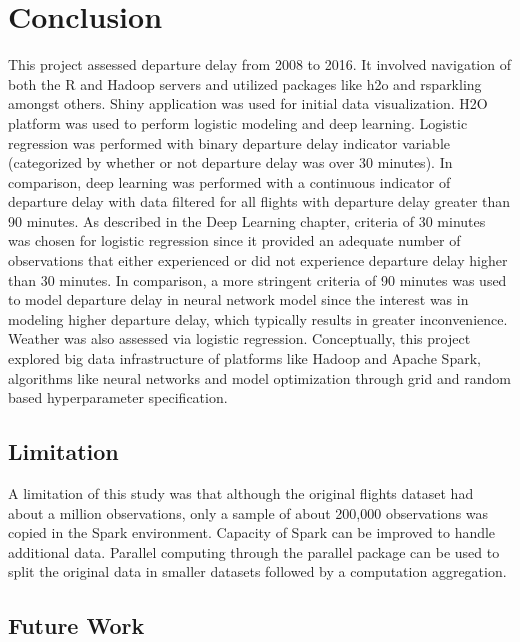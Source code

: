 \documentclass[12pt,twoside]{amherstthesis}
\begin{document}
  \chapter*{Conclusion}\label{conclusion-2}
  
  This project assessed departure delay from 2008 to 2016. It involved
  navigation of both the R and Hadoop servers and utilized packages like
  h2o and rsparkling amongst others. Shiny application was used for
  initial data visualization. H2O platform was used to perform logistic
  modeling and deep learning. Logistic regression was performed with
  binary departure delay indicator variable (categorized by whether or not
  departure delay was over 30 minutes). In comparison, deep learning was
  performed with a continuous indicator of departure delay with data
  filtered for all flights with departure delay greater than 90 minutes.
  As described in the Deep Learning chapter, criteria of 30 minutes was
  chosen for logistic regression since it provided an adequate number of
  observations that either experienced or did not experience departure
  delay higher than 30 minutes. In comparison, a more stringent criteria
  of 90 minutes was used to model departure delay in neural network model
  since the interest was in modeling higher departure delay, which
  typically results in greater inconvenience. Weather was also assessed
  via logistic regression. Conceptually, this project explored big data
  infrastructure of platforms like Hadoop and Apache Spark, algorithms
  like neural networks and model optimization through grid and random
  based hyperparameter specification.
  
  \section{Limitation}\label{limitation}
  
  A limitation of this study was that although the original flights
  dataset had about a million observations, only a sample of about 200,000
  observations was copied in the Spark environment. Capacity of Spark can
  be improved to handle additional data. Parallel computing through the
  parallel package can be used to split the original data in smaller
  datasets followed by a computation aggregation.
  
  \section{Future Work}\label{future-work}
  
\end{document}
